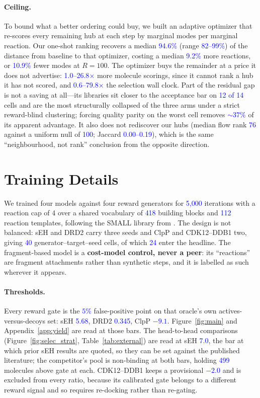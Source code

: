 \documentclass{article}
\newcommand{\checkval}[1]{\textcolor{blue}{#1}}
\begin{document}
\paragraph{Ceiling.}
To bound what a better ordering could buy, we built an adaptive optimizer that re-scores every remaining hub at each step by marginal modes per marginal reaction. Our one-shot ranking recovers a median \checkval{94.6\%} (range \checkval{82--99\%}) of the distance from baseline to that optimizer, costing a median \checkval{9.2\%} more reactions, or \checkval{10.9\%} fewer modes at $R = 100$. The optimizer buys the remainder at a price it does not advertise: \checkval{1.0--26.8$\times$} more molecule scorings, since it cannot rank
a hub it has not scored, and \checkval{0.6--79.8$\times$} the selection wall clock. Part of the residual gap is not a saving at all---its libraries sit closer to the acceptance bar on \checkval{12 of 14} cells and are the most structurally collapsed of the three arms under a strict reward-blind clustering; forcing quality parity on the worst cell removes \checkval{$\sim$37\%} of its apparent advantage. It also does not rediscover our hubs (median flow rank \checkval{76} against a uniform null of \checkval{100}; Jaccard \checkval{0.00--0.19}), which is the same ``neighbourhood, not rank'' conclusion from the opposite direction.


\section{Training Details}
\label{app:training}
We trained four models against four reward generators for \checkval{5{,}000} iterations with a reaction cap of 4 over a shared vocabulary of \checkval{418} building blocks and \checkval{112} reaction templates, following the SMALL library from \cite{gainski2026scent}. The design is not balanced: sEH and DRD2 carry three seeds and ClpP and CDK12--DDB1 two, giving \checkval{40} generator--target--seed cells, of which \checkval{24} enter the headline. The fragment-based model is a \textbf{cost-model control, never a peer}: its ``reactions'' are fragment attachments rather than synthetic steps, and it is labelled as such wherever it appears.

\paragraph{Thresholds.}
Every reward gate is the \checkval{$5\%$} false-positive point on that oracle's own actives-versus-decoys set: sEH \checkval{5.68}, DRD2 \checkval{0.345}, ClpP \checkval{$-9.1$}. Figure~\ref{fig:main} and Appendix~\ref{app:yield} are read at those bars. The head-to-head comparisons (Figure~\ref{fig:selec_strat}, Table~\ref{tab:external}) are read at sEH \checkval{7.0}, the bar at which prior sEH results are quoted, so they can be set against the published literature; the competitor's pool is non-binding at both bars, holding \checkval{499} molecules above gate at each. CDK12--DDB1 keeps a provisional \checkval{$-2.0$} and is excluded from every ratio, because its calibrated gate belongs to a different reward signal and so requires re-docking rather than re-gating.
\end{document}
